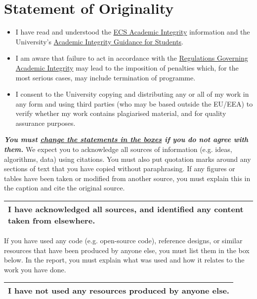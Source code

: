 \section*{Statement of Originality}

\begin{itemize}
  \item I have read and understood the \href{}{ECS Academic Integrity}
        information and the University's \href{}{Academic Integrity
        Guidance for Students}.
  \item I am aware that failure to act in accordance with the \href{}
        {Regulations Governing Academic Integrity} may lead to the
        imposition of penalties which, for the most serious cases, may 
        include termination of programme.
  \item I consent to the University copying and distributing any or all 
        of my work in any form and using third parties (who may be based 
        outside the EU/EEA) to verify whether my work contains plagiarised 
        material, and for quality assurance purposes.
\end{itemize}
\vspace{2mm}
\noindent\textbf{\textit{You must \underline{change the statements in the boxes} if 
you do not agree with them.}}
\x
\noindent We expect you to acknowledge all sources of information (e.g. ideas, algorithms, data) using
citations. You must also put quotation marks around any sections of text that you have copied
without paraphrasing. If any figures or tables have been taken or modified from another source,
you must explain this in the caption and cite the original source.

\begin{longtable}[ht]{ | p{\textwidth} | }
  \toprule
  \textbf{ I have acknowledged all sources, and identified any content taken from elsewhere.}
  \\\bottomrule
\end{longtable}

\noindent If you have used any code (e.g. open-source code), reference designs, or similar resources that
have been produced by anyone else, you must list them in the box below. In the report, you must
explain what was used and how it relates to the work you have done.

\begin{longtable}[ht]{ | p{\textwidth} | }
  \toprule
  \textbf{I have not used any resources produced by anyone else.
  }
  \\\bottomrule
\end{longtable}

